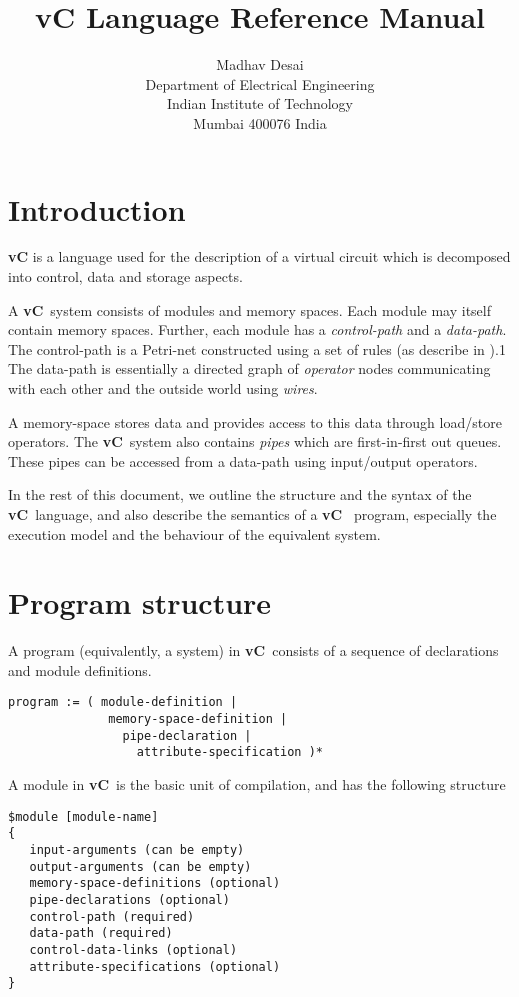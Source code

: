 \documentclass{article}
\title{vC Language Reference Manual}
\author{Madhav Desai \\ Department of Electrical Engineering \\ Indian Institute of Technology \\
	Mumbai 400076 India}
\newcommand{\vC}{{\bf vC}~}
\begin{document}
\maketitle

\section{Introduction}

{\bf vC} is a language used for the description
of a virtual circuit which is decomposed into
control, data and storage aspects.

A \vC system consists of modules and memory spaces.
Each module may itself contain memory spaces.  Further,
each module has a {\em control-path} and a {\em data-path}.
The control-path is a Petri-net constructed using
a set of rules (as describe in \cite{ref:SameerPhD}).1
The data-path is essentially a directed graph of {\em operator } nodes
communicating with each other and the outside world using {\em wires}.

A memory-space stores data and provides access to this
data through load/store operators.
The \vC system also  contains {\em pipes} which
are first-in-first out queues. These pipes can
be accessed from a data-path using input/output
operators.

In the rest of this document, we outline the
structure and the syntax of the \vC language,
and also describe the semantics of a \vC
program, especially the execution model and
the behaviour of the equivalent system.


\section{Program structure}


A program (equivalently, a system) in \vC consists of a sequence of
declarations and module definitions.  
\begin{verbatim}
program := ( module-definition | 
              memory-space-definition | 
                pipe-declaration | 
                  attribute-specification )*
\end{verbatim}

A module in \vC is the basic unit of compilation, and
has the following structure
\begin{verbatim}
$module [module-name] 
{
   input-arguments (can be empty)
   output-arguments (can be empty)
   memory-space-definitions (optional)
   pipe-declarations (optional)
   control-path (required)
   data-path (required)
   control-data-links (optional)
   attribute-specifications (optional)
}
\end{verbatim}
\end{document}
